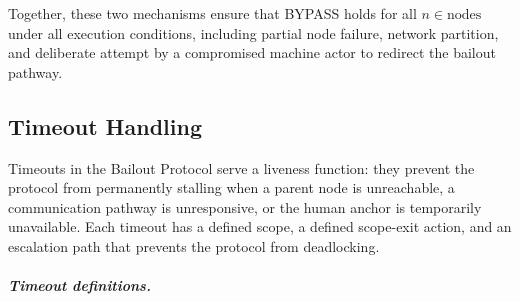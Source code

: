 Together, these two mechanisms ensure that BYPASS holds for all $n \in \text{nodes}$ under all execution conditions, including partial node failure, network partition, and deliberate attempt by a compromised machine actor to redirect the bailout pathway.

\subsection{Timeout Handling}\label{sec:timeout-handling}

Timeouts in the Bailout Protocol serve a liveness function: they prevent the protocol from permanently stalling when a parent node is unreachable, a communication pathway is unresponsive, or the human anchor is temporarily unavailable. Each timeout has a defined scope, a defined scope-exit action, and an escalation path that prevents the protocol from deadlocking.

\subparagraph{Timeout definitions.}

